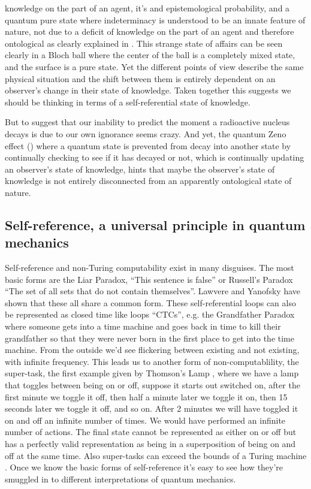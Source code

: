 knowledge on the part of an agent, it's and epistemological probability, and a quantum pure
state where indeterminacy is understood to be an innate feature of nature, not due to a deficit
of knowledge on the part of an agent and therefore ontological as clearly explained in
\autocite{bruknerzeilinger2001shannon}. This strange state of affairs can be seen clearly in a
Bloch ball where the center of the ball is a completely mixed state, and the surface is a pure
state. Yet the different points of view describe the same physical situation and the shift
between them is entirely dependent on an observer's change in their state of knowledge. Taken
together this suggests we should be thinking in terms of a self-referential state of knowledge.

But to suggest that our inability to predict the moment a radioactive nucleus decays is due to
our own ignorance seems crazy. And yet, the quantum Zeno effect
(\autocite{georgesu_2022, saverio_2013, Misra1977TheTheory}) where a quantum state is prevented
from decay into another state by continually checking to see if it has decayed or not, which is
continually updating an observer's state of knowledge, hints that maybe the observer's state of
knowledge is not entirely disconnected from an apparently ontological state of nature.


\subsection{Self-reference, a universal principle in quantum mechanics}

Self-reference and non-Turing computability exist in many disguises. The most basic forms are
the Liar Paradox, \enquote{This sentence is false} or Russell's Paradox
\enquote{The set of all sets that do not contain themselves}. Lawvere \autocite{Lawvere_1969}
and Yanofsky \autocite{Yanofsky2003} have shown that these all share a common form. These
self-referential loops can also be represented as closed time like loops \enquote{CTCs}, e.g.
the Grandfather Paradox where someone gets into a time machine and goes back in time to kill
their grandfather so that they were never born in the first place to get into the time machine.
From the outside we'd see flickering between existing and not existing, with infinite frequency.
This leads us to another form of non-computablility, the super-task, the first example given by
Thomson's Lamp \autocite{Svozil2009}, where we have a lamp that toggles between being on or off,
suppose it starts out switched on, after the first minute we toggle it off, then half a minute
later we toggle it on, then 15 seconds later we toggle it off, and so on. After 2 minutes we
will have toggled it on and off an infinite number of times. We would have performed an infinite
number of actions. The final state cannot be represented as either on or off but has a perfectly
valid representation as being in a superposition of being on and off at the same time. Also
super-tasks can exceed the bounds of a Turing machine
\autocite{shagrirSupertasksAcceleratingTuring2004,Hamkins_2002,Copeland_2002}. Once we know the basic forms of
self-reference it's easy to see how they're smuggled in to different interpretations of quantum
mechanics.

